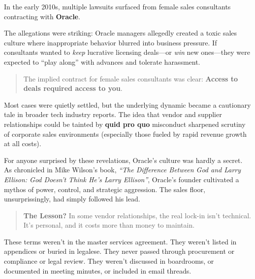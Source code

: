 \begin{tcolorbox}[colback=blue!5!white, colframe=blue!50!black, breakable,
  title={Historical Sidebar: When Dependency Gets Personal --- The Oracle Consultant Allegations}]

In the early 2010s, multiple lawsuits surfaced from female sales consultants contracting with \textbf{Oracle}.  

\medskip

The allegations were striking: Oracle managers allegedly created a toxic sales culture where inappropriate behavior blurred into business pressure.  If consultants wanted to \textit{keep} lucrative licensing deals—or \textit{win} new ones—they were expected to ``play along'' with advances and tolerate harassment.

\medskip

\begin{quote}
The implied contract for female sales consultants was clear: \textbf{Access to deals required access to you}.
\end{quote}

\medskip

Most cases were quietly settled, but the underlying dynamic became a cautionary tale in broader tech industry reports.  The idea that vendor and supplier relationships could be tainted by \textbf{quid pro quo} misconduct sharpened scrutiny of corporate sales environments (especially those fueled by rapid revenue growth at all costs).

\medskip

For anyone surprised by these revelations, Oracle's culture was hardly a secret.  As chronicled in Mike Wilson's book, \textit{``The Difference Between God and Larry Ellison: God Doesn't Think He's Larry Ellison''}, Oracle’s founder cultivated a mythos of power, control, and strategic aggression.  The sales floor, unsurprissingly, had simply followed his lead.

\medskip

\begin{quote}
\textbf{The Lesson?} In some vendor relationships, the real lock-in isn't technical. It's personal, and it costs more than money to maintain.
\end{quote}

\end{tcolorbox}

These terms weren’t in the master services agreement. They weren’t listed in appendices or buried in legalese. They never passed through procurement or compliance or legal review. They weren’t discussed in boardrooms, or documented in meeting minutes, or included in email threads.

